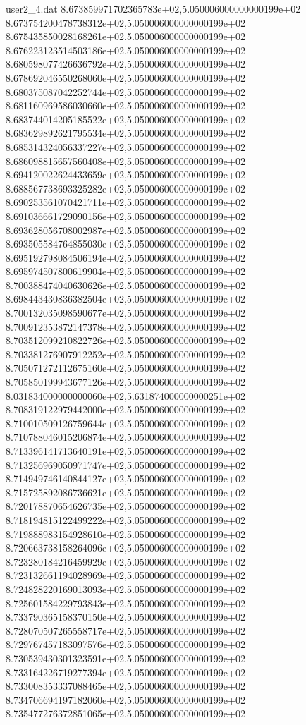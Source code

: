 \begin{filecontents}{user2_4.dat}
8.673859971702365783e+02,5.050006000000000199e+02
8.673754200478738312e+02,5.050006000000000199e+02
8.675435850028168261e+02,5.050006000000000199e+02
8.676223123514503186e+02,5.050006000000000199e+02
8.680598077426636792e+02,5.050006000000000199e+02
8.678692046550268060e+02,5.050006000000000199e+02
8.680375087042252744e+02,5.050006000000000199e+02
8.681160969586030660e+02,5.050006000000000199e+02
8.683744014205185522e+02,5.050006000000000199e+02
8.683629892621795534e+02,5.050006000000000199e+02
8.685314324056337227e+02,5.050006000000000199e+02
8.686098815657560408e+02,5.050006000000000199e+02
8.694120022624433659e+02,5.050006000000000199e+02
8.688567738693325282e+02,5.050006000000000199e+02
8.690253561070421711e+02,5.050006000000000199e+02
8.691036661729090156e+02,5.050006000000000199e+02
8.693628056708002987e+02,5.050006000000000199e+02
8.693505584764855030e+02,5.050006000000000199e+02
8.695192798084506194e+02,5.050006000000000199e+02
8.695974507800619904e+02,5.050006000000000199e+02
8.700388474040630626e+02,5.050006000000000199e+02
8.698443430836382504e+02,5.050006000000000199e+02
8.700132035098590677e+02,5.050006000000000199e+02
8.700912353872147378e+02,5.050006000000000199e+02
8.703512099210822726e+02,5.050006000000000199e+02
8.703381276907912252e+02,5.050006000000000199e+02
8.705071272112675160e+02,5.050006000000000199e+02
8.705850199943677126e+02,5.050006000000000199e+02
8.031834000000000060e+02,5.631874000000000251e+02
8.708319122979442000e+02,5.050006000000000199e+02
8.710010509126759644e+02,5.050006000000000199e+02
8.710788046015206874e+02,5.050006000000000199e+02
8.713396141713640191e+02,5.050006000000000199e+02
8.713256969050971747e+02,5.050006000000000199e+02
8.714949746140844127e+02,5.050006000000000199e+02
8.715725892086736621e+02,5.050006000000000199e+02
8.720178870654626735e+02,5.050006000000000199e+02
8.718194815122499222e+02,5.050006000000000199e+02
8.719888983154928610e+02,5.050006000000000199e+02
8.720663738158264096e+02,5.050006000000000199e+02
8.723280184216459929e+02,5.050006000000000199e+02
8.723132661194028969e+02,5.050006000000000199e+02
8.724828220169013093e+02,5.050006000000000199e+02
8.725601584229793843e+02,5.050006000000000199e+02
8.733790365158370150e+02,5.050006000000000199e+02
8.728070507265558717e+02,5.050006000000000199e+02
8.729767457183097576e+02,5.050006000000000199e+02
8.730539430301323591e+02,5.050006000000000199e+02
8.733164226719277394e+02,5.050006000000000199e+02
8.733008353337088465e+02,5.050006000000000199e+02
8.734706694197182060e+02,5.050006000000000199e+02
8.735477276372851065e+02,5.050006000000000199e+02

\end{filecontents}

